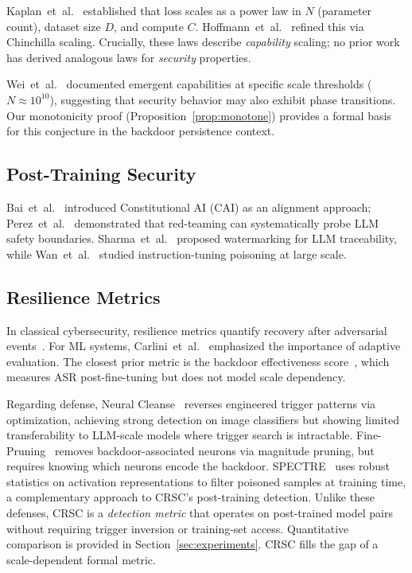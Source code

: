 Kaplan~et~al.~\cite{kaplan2020scaling} established that loss scales as a power
law in $N$ (parameter count), dataset size $D$, and compute $C$. Hoffmann~et~al.~\cite{hoffmann2022training}
refined this via Chinchilla scaling. Crucially, these laws describe \emph{capability}
scaling; no prior work has derived analogous laws for \emph{security} properties.

Wei~et~al.~\cite{wei2022emergent} documented emergent capabilities at specific
scale thresholds ($N \approx 10^{10}$), suggesting that security behavior may
also exhibit phase transitions. Our monotonicity proof (Proposition~\ref{prop:monotone})
provides a formal basis for this conjecture in the backdoor persistence context.

\subsection{Post-Training Security}

Bai~et~al.~\cite{bai2022constitutional} introduced Constitutional AI (CAI) as an
alignment approach; Perez~et~al.~\cite{perez2022red} demonstrated that red-teaming
can systematically probe LLM safety boundaries. Sharma~et~al.~\cite{sharma2023towards}
proposed watermarking for LLM traceability, while Wan~et~al.~\cite{wan2023poisoning}
studied instruction-tuning poisoning at large scale.

\subsection{Resilience Metrics}

In classical cybersecurity, resilience metrics quantify recovery after adversarial
events~\cite{linkov2013resilience}. For ML systems, Carlini~et~al.~\cite{carlini2019evaluating}
emphasized the importance of adaptive evaluation. The closest prior metric is the
backdoor effectiveness score~\cite{li2022backdoor}, which measures ASR post-fine-tuning
but does not model scale dependency.

Regarding defense, Neural Cleanse~\cite{wang2019neural} reverses engineered
trigger patterns via optimization, achieving strong detection on image classifiers
but showing limited transferability to LLM-scale models where trigger search is
intractable. Fine-Pruning~\cite{liu2018fine} removes backdoor-associated neurons
via magnitude pruning, but requires knowing which neurons encode the backdoor.
SPECTRE~\cite{hayase2021spectre} uses robust statistics on activation
representations to filter poisoned samples at training time, a complementary
approach to CRSC's post-training detection.
Unlike these defenses, CRSC is a \emph{detection metric} that operates on
post-trained model pairs without requiring trigger inversion or training-set access.
Quantitative comparison is provided in Section~\ref{sec:experiments}. CRSC fills
the gap of a scale-dependent formal metric.

